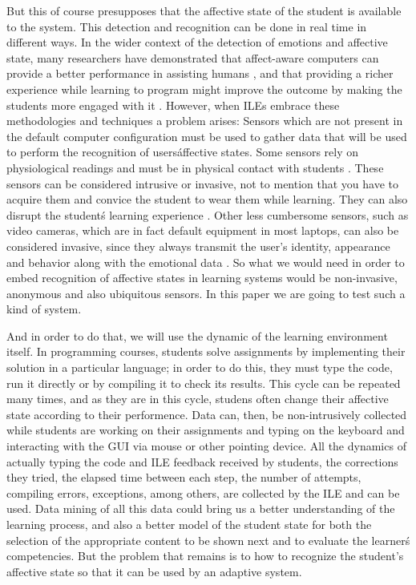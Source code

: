 \documentclass[a4paper,twoside]{article}
\begin{document}
But this of course presupposes that the affective state of the student
is available to the system. This detection and recognition can be done
in real time in different ways. In the wider context of the detection
of emotions and affective 
state, many researchers have
demonstrated that affect-aware computers can provide a better performance in
assisting humans
\cite{picard2001toward,munson2018models,bosch2017affective}, and that
providing a richer experience while learning to program might improve
the outcome by making the students more engaged with it
\cite{asensio2014progamer}. However, when ILEs embrace these methodologies
and techniques a
problem arises: Sensors which are not present in the default computer
configuration must be used to gather data that will be used to perform the
recognition of users\' affective states.
Some sensors rely on physiological readings
and must be in physical contact with students \cite{atkinson2017assessing,swansianalyzing}.
These sensors can be considered
intrusive or invasive, not to mention that you have to acquire them
and convice the student to wear them while learning.  They can also disrupt the student\'s learning experience
\cite{zhai2008stress, sidney2005integrating, arroyo2009emotion}.
Other less cumbersome sensors, such as video cameras, which are in
fact default equipment in most laptops, can also be considered invasive, since
they always transmit the user's identity, appearance and behavior along with
the emotional data \cite{picard2001toward}. So what we would need in
order to embed recognition of affective states in learning systems
would be non-invasive, anonymous and also ubiquitous sensors. In this
paper we are going to test such a kind of system.

And in order to do that, we will use the dynamic of the learning
environment itself. In programming courses, students solve assignments
by implementing their solution in a particular language; in order to
do this, they must type the code, run it directly or by compiling it
to check its results. This cycle can be repeated many times, and as
they are in this cycle, studens often change their affective state
according to their performence.  Data can, then, be non-intrusively
collected while students are working on their assignments and typing
on the keyboard and interacting with the GUI via mouse or other
pointing device.  All the dynamics of actually typing the code and ILE
feedback received by students, the corrections they tried, the elapsed
time between each step, the number of attempts, compiling errors,
exceptions, among others, are collected by the ILE and can be
used. Data mining of all this data could bring us a better
understanding of the learning process, and also a better model of the
student state for both the selection of the appropriate content to be
shown next and to evaluate the learner\'s competencies. But the
problem that remains is to how to recognize the student's affective
state so that it can be used by an adaptive system.
\end{document}
